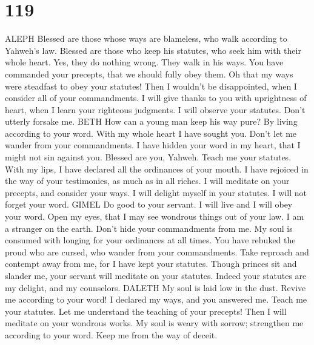 \hypertarget{section-109}{%
\section{119}\label{section-109}}

ALEPH  Blessed are those whose ways are blameless, who walk
according to Yahweh's law.  Blessed are those who keep his
statutes, who seek him with their whole heart.  Yes, they do
nothing wrong. They walk in his ways.  You have commanded
your precepts, that we should fully obey them.  Oh that my
ways were steadfast to obey your statutes!  Then I wouldn't
be disappointed, when I consider all of your commandments. 
I will give thanks to you with uprightness of heart, when I learn your
righteous judgments.  I will observe your statutes. Don't
utterly forsake me. BETH  How can a young man keep his way
pure? By living according to your word.  With my whole
heart I have sought you. Don't let me wander from your commandments.
 I have hidden your word in my heart, that I might not sin
against you.  Blessed are you, Yahweh. Teach me your
statutes.  With my lips, I have declared all the ordinances
of your mouth.  I have rejoiced in the way of your
testimonies, as much as in all riches.  I will meditate on
your precepts, and consider your ways.  I will delight
myself in your statutes. I will not forget your word. GIMEL
 Do good to your servant. I will live and I will obey your
word.  Open my eyes, that I may see wondrous things out of
your law.  I am a stranger on the earth. Don't hide your
commandments from me.  My soul is consumed with longing for
your ordinances at all times.  You have rebuked the proud
who are cursed, who wander from your commandments.  Take
reproach and contempt away from me, for I have kept your statutes.
 Though princes sit and slander me, your servant will
meditate on your statutes.  Indeed your statutes are my
delight, and my counselors. DALETH  My soul is laid low in
the dust. Revive me according to your word!  I declared my
ways, and you answered me. Teach me your statutes.  Let me
understand the teaching of your precepts! Then I will meditate on your
wondrous works.  My soul is weary with sorrow; strengthen
me according to your word.  Keep me from the way of deceit.
